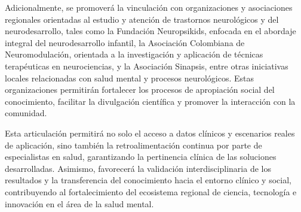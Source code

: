 Adicionalmente, se promoverá la vinculación con organizaciones y asociaciones regionales orientadas al estudio y atención de trastornos neurológicos y del neurodesarrollo, tales como la Fundación Neuropsikids, enfocada en el abordaje integral del neurodesarrollo infantil, la Asociación Colombiana de Neuromodulación, orientada a la investigación y aplicación de técnicas terapéuticas en neurociencias, y la Asociación Sinapsis, entre otras iniciativas locales relacionadas con salud mental y procesos neurológicos. Estas organizaciones permitirán fortalecer los procesos de apropiación social del conocimiento, facilitar la divulgación científica y promover la interacción con la comunidad.

Esta articulación permitirá no solo el acceso a datos clínicos y escenarios reales de aplicación, sino también la retroalimentación continua por parte de especialistas en salud, garantizando la pertinencia clínica de las soluciones desarrolladas. Asimismo, favorecerá la validación interdisciplinaria de los resultados y la transferencia del conocimiento hacia el entorno clínico y social, contribuyendo al fortalecimiento del ecosistema regional de ciencia, tecnología e innovación en el área de la salud mental.